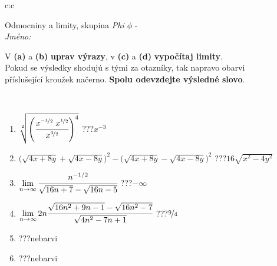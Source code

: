 \documentclass[10pt]{report}
\begin{document}
\newpage
\thispagestyle{empty}
\begin{tabular}{c:c}
\begin{minipage}[c][104.5mm][t]{0.5\linewidth}
\begin{center}
\vspace{7mm}
{\huge Odmocniny a limity, skupina \textit{Phi $\phi$} -}\\[5mm]
\textit{Jméno:}\phantom{xxxxxxxxxxxxxxxxxxxxxxxxxxxxxxxxxxxxxxxxxxxxxxxxxxxxxxxxxxxxxxxxx}\\[5mm]
\begin{minipage}{0.95\linewidth}
\begin{center}
V \textbf{(a)} a \textbf{(b)} \textbf{uprav výrazy}, v \textbf{(c)} a \textbf{(d)} \textbf{vypočítaj limity}.\\Pokud se výsledky shodujú s tými za otazníky, tak napravo obarvi\\příslušející kroužek načerno. \textbf{Spolu odevzdejte výsledné slovo}.
\end{center}
\end{minipage}
\\[1mm]
\begin{minipage}{0.79\linewidth}
\begin{center}
\begin{varwidth}{\linewidth}
\begin{enumerate}
\small
\item $\sqrt[2]{\left(\cfrac{x^{\nicefrac{-1}{2}}\;x^{\nicefrac{1}{2}}}{x^{\nicefrac{3}{2}}}\right)^{4}}$\quad \dotfill\; ???\;\dotfill \quad $x^{-3}$
\item {\footnotesize{\scriptsize$\big(\sqrt{4x+8y}+\sqrt{4x-8y}\big)^2-\big(\sqrt{4x+8y}-\sqrt{4x-8y}\big)^2$}\quad \dotfill\; ???\;\dotfill \quad $16\sqrt{x^2-4y^2}$}
\item $\lim\limits_{n\to\infty}\cfrac{n^{-1/2}}{\sqrt{16n+7}-\sqrt{16n-5}}$\quad \dotfill\; ???\;\dotfill \quad $-\infty$
\item $\lim\limits_{n\to\infty}2n\cfrac{\sqrt{16n^2+9n-1}-\sqrt{16n^2-7}}{\sqrt{4n^2-7n+1}}$\quad \dotfill\; ???\;\dotfill \quad $\nicefrac{9}{4}$
\item \quad \dotfill\; ???\;\dotfill \quad nebarvi
\item \quad \dotfill\; ???\;\dotfill \quad nebarvi
\end{enumerate}
\end{varwidth}
\end{center}
\end{minipage}
\begin{minipage}{0.20\linewidth}

\end{minipage}
\end{center}
\end{minipage}
\end{tabular}
\end{document}
